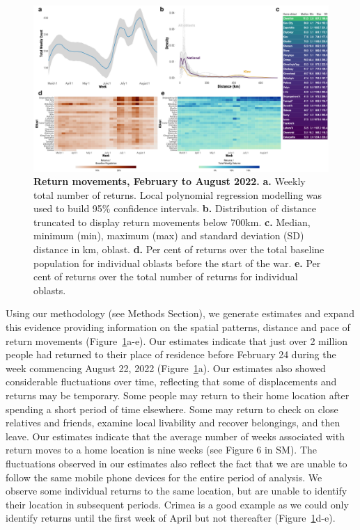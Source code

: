 \documentclass[
  sn-nature,
  11pt,
]{sn-jnl}
\begin{document}
\begin{figure}

\begin{minipage}{\linewidth}

\includegraphics[width=\linewidth,height=0.6\textheight,keepaspectratio]{../outputs/2_3/dougs_returns/fig3.pdf}

\end{minipage}%

\caption{\label{fig-returns}\textbf{Return movements, February to August
2022.} \textbf{a.} Weekly total number of returns. Local polynomial
regression modelling was used to build 95\% confidence intervals.
\textbf{b.} Distribution of distance truncated to display return
movements below 700km. \textbf{c.} Median, minimum (min), maximum (max)
and standard deviation (SD) distance in km, oblast. \textbf{d.} Per cent
of returns over the total baseline population for individual oblasts
before the start of the war. \textbf{e.} Per cent of returns over the
total number of returns for individual oblasts.}

\end{figure}%

Using our methodology (see Methods Section), we generate estimates and
expand this evidence providing information on the spatial patterns,
distance and pace of return movements (Figure~\ref{fig-returns}a-e). Our
estimates indicate that just over 2 million people had returned to their
place of residence before February 24 during the week commencing August
22, 2022 (Figure~\ref{fig-returns}a). Our estimates also showed
considerable fluctuations over time, reflecting that some of
displacements and returns may be temporary. Some people may return to
their home location after spending a short period of time elsewhere.
Some may return to check on close relatives and friends, examine local
livability and recover belongings, and then leave. Our estimates
indicate that the average number of weeks associated with return moves
to a home location is nine weeks (see Figure 6 in SM). The fluctuations
observed in our estimates also reflect the fact that we are unable to
follow the same mobile phone devices for the entire period of analysis.
We observe some individual returns to the same location, but are unable
to identify their location in subsequent periods. Crimea is a good
example as we could only identify returns until the first week of April
but not thereafter (Figure~\ref{fig-returns}d-e).
\end{document}
